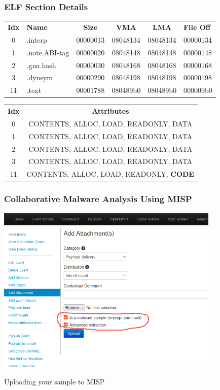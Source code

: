\begin{frame}[fragile]
\frametitle{ELF Section Details}

\begin{tabular}{clcccp{1cm}}
\textbf{Idx} & \textbf{Name}       & \textbf{Size}  & \textbf{VMA}     & \textbf{LMA}     & \textbf{File Off} \\
0            & .interp            & 00000013       & 08048134         & 08048134         & 00000134          \\
1            & .note.ABI-tag      & 00000020       & 08048148         & 08048148         & 00000148          \\
2            & .gnu.hash          & 00000030       & 08048168         & 08048168         & 00000168          \\
3            & .dynsym            & 00000290       & 08048198         & 08048198         & 00000198          \\
11           & .text              & 00001788       & 080489b0         & 080489b0         & 000009b0          \\

\end{tabular}

\vspace{1cm}

\begin{tabular}{cc}
\textbf{Idx} &  \textbf{Attributes}\\
0            &  CONTENTS, ALLOC, LOAD, READONLY, DATA \\
1            &  CONTENTS, ALLOC, LOAD, READONLY, DATA \\
2            &  CONTENTS, ALLOC, LOAD, READONLY, DATA \\
3            &  CONTENTS, ALLOC, LOAD, READONLY, DATA \\
11           &  CONTENTS, ALLOC, LOAD, READONLY, \textbf{CODE}
\end{tabular}

\end{frame}


\begin{frame}
\frametitle{Collaborative Malware Analysis Using MISP}

\centering
\includegraphics[width=0.8\textwidth]{img/upload2.png}

Uploading your sample to MISP

\end{frame}

